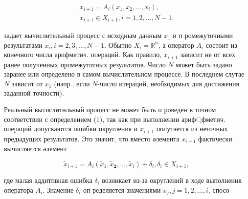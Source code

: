 \documentclass[10pt]{article}
\begin{document}
\[

\begin{gathered}

x_{i+1}=A_{i}\left(x_{1}, x_{2}, \ldots, x_{i}\right), \\

x_{i+1} \in X_{i+1}, i=1,2, \ldots, N-1,

\end{gathered}

\]



задает вычислительный процесс с исходным данным $x_{1}$ и п ромежуточными результатами $x_{i}, i=2,3, \ldots, N-1$. Обытно $X_{i}=\mathbb{R}^{n}$, а оператор $A_{i}$ состоит из конечного числа арифметич. операций. Как правило, $x_{i+1}$ зависит не от всех ранее полученных промежутотных результатов. Число $N$ может быть задано заранее или определено в самом вычислительном процессе. В последнем слутае $N$ зависит от $x_{1}$ (напр., если $N$-число итераций, необходимых для достижения заданной точности).



Реальный вытислитөльный процесс не может быть п роведен в точном соответствии с определением (1), так как при выполнении ариф্фметич. операций допускаются ошибки округления и $x_{i+1}$ полутается из неточных предыдущих результатов. Это значит, что вместо әлемента $x_{i+1}$ фактически вычисляется әлемент



\[

\tilde{x}_{i+1}=A_{i}\left(\tilde{x}_{1}, \tilde{x}_{\mathbf{2}}, \ldots, \tilde{x}_{i}\right)+\delta_{i}, \delta_{i} \in X_{i+1} \text {, }

\]



где малая аддитпвная ошибка $\delta_{i}$ возникает из-за округлений в ходе выполнения оператора $A_{i}$. Значение $\delta_{i}$ оп ределяется значениями $\tilde{x}_{j}, j=1,2, \ldots, i$, спосо-
\end{document}
